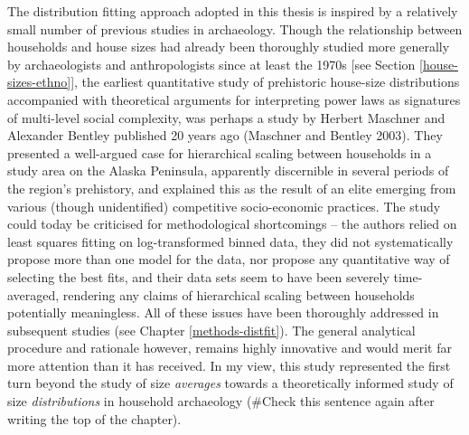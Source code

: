 \documentclass[
  12pt,
  a4paper, twoside]{book}
\begin{document}
The distribution fitting approach adopted in this thesis is inspired by a relatively small number of previous studies in archaeology. Though the relationship between households and house sizes had already been thoroughly studied more generally by archaeologists and anthropologists since at least the 1970s {[}see Section \ref{house-sizes-ethno}{]}, the earliest quantitative study of prehistoric house-size distributions accompanied with theoretical arguments for interpreting power laws as signatures of multi-level social complexity, was perhaps a study by Herbert Maschner and Alexander Bentley published 20 years ago (Maschner and Bentley 2003). They presented a well-argued case for hierarchical scaling between households in a study area on the Alaska Peninsula, apparently discernible in several periods of the region's prehistory, and explained this as the result of an elite emerging from various (though unidentified) competitive socio-economic practices. The study could today be criticised for methodological shortcomings -- the authors relied on least squares fitting on log-transformed binned data, they did not systematically propose more than one model for the data, nor propose any quantitative way of selecting the best fits, and their data sets seem to have been severely time-averaged, rendering any claims of hierarchical scaling between households potentially meaningless. All of these issues have been thoroughly addressed in subsequent studies (see Chapter \ref{methods-distfit}). The general analytical procedure and rationale however, remains highly innovative and would merit far more attention than it has received. In my view, this study represented the first turn beyond the study of size \emph{averages} towards a theoretically informed study of size \emph{distributions} in household archaeology (\#Check this sentence again after writing the top of the chapter).
\end{document}
